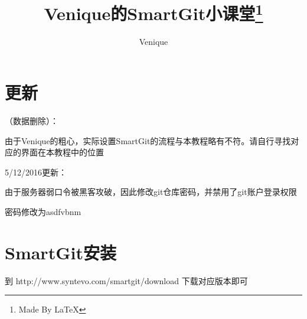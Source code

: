 \documentclass[10pt,a4paper,UTF8]{article}
\begin{document}
    \setlength{\parindent}{2em}                        %
    \renewcommand{\baselinestretch}{1.5}\normalsize    %

    \renewcommand*{\qedsymbol}{[证毕]}                 %
    \newcommand{\HEI}{\CJKfamily{hei}}                 %
    \newcommand{\KAI}{\CJKfamily{kai}}                 %

    \newcommand{\romannum}[1]{\expandafter{\romannumeral#1}}    %

    \newtheorem{instance}{}[section]

    \begin{titlepage}
        \title{Venique的SmartGit小课堂\footnote{Made By \LaTeX}}
        \author{Venique}


        \maketitle
        \thispagestyle{empty}
        
        \vspace{0.55\textheight}
        
    \end{titlepage}

    \newpage

    \pagestyle{fancy}
    \rfoot{\thepage} 
    \cfoot{}
    \section{更新}
        （数据删除）：

            由于Venique的粗心，实际设置SmartGit的流程与本教程略有不符。请自行寻找对应的界面在本教程中的位置

        5/12/2016更新：

            由于服务器弱口令被黑客攻破，因此修改git仓库密码，并禁用了git账户登录权限

            密码修改为asdfvbnm

    \section{SmartGit安装}
        到 http://www.syntevo.com/smartgit/download 下载对应版本即可
\end{document}
